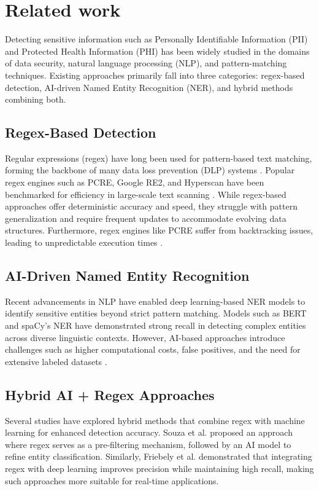 \section{Related work}
\label{sec:Literature review 
}
Detecting sensitive information such as Personally Identifiable Information (PII) and Protected Health Information (PHI) has been widely studied in the domains of data security, natural language processing (NLP), and pattern-matching techniques. Existing approaches primarily fall into three categories: regex-based detection, AI-driven Named Entity Recognition (NER), and hybrid methods combining both.

\subsection{Regex-Based Detection}
Regular expressions (regex) have long been used for pattern-based text matching, forming the backbone of many data loss prevention (DLP) systems \cite{garfinkel2022differential}. Popular regex engines such as PCRE, Google RE2, and Hyperscan have been benchmarked for efficiency in large-scale text scanning \cite{venkateshliterary}. While regex-based approaches offer deterministic accuracy and speed, they struggle with pattern generalization and require frequent updates to accommodate evolving data structures. Furthermore, regex engines like PCRE suffer from backtracking issues, leading to unpredictable execution times \cite{van2022investigation}.

\subsection{AI-Driven Named Entity Recognition}
Recent advancements in NLP have enabled deep learning-based NER models to identify sensitive entities beyond strict pattern matching. Models such as BERT \cite{kenton2019bert} and spaCy's NER \cite{honnibal2020spacy} have demonstrated strong recall in detecting complex entities across diverse linguistic contexts. However, AI-based approaches introduce challenges such as higher computational costs, false positives, and the need for extensive labeled datasets \cite{li2020survey}.

\subsection{Hybrid AI + Regex Approaches}
Several studies have explored hybrid methods that combine regex with machine learning for enhanced detection accuracy. Souza et al. \cite{souza2024combining} proposed an approach where regex serves as a pre-filtering mechanism, followed by an AI model to refine entity classification. Similarly, Friebely et al. \cite{friebely2022analyzing} demonstrated that integrating regex with deep learning improves precision while maintaining high recall, making such approaches more suitable for real-time applications.

